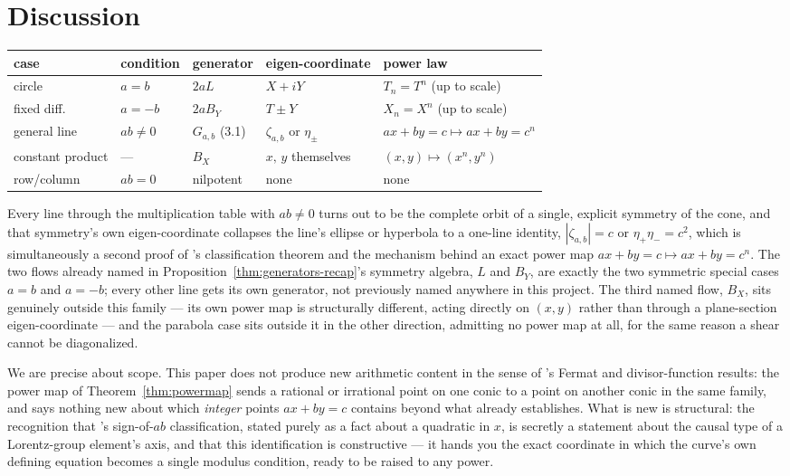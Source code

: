 \documentclass[11pt]{amsart}
\theoremstyle{remark}
\begin{document}
\section{Discussion}

\begin{center}
\begin{tabular}{lllll}
\hline
case & condition & generator & eigen-coordinate & power law \\
\hline
circle & $a=b$ & $2aL$ & $X+iY$ & $T_n=T^n$ (up to scale) \\
fixed diff. & $a=-b$ & $2aB_Y$ & $T\pm Y$ & $X_n=X^n$ (up to scale) \\
general line & $ab\ne0$ & $G_{a,b}$ (3.1) & $\zeta_{a,b}$ or $\eta_\pm$ & $ax+by=c\mapsto ax+by=c^n$ \\
constant product & --- & $B_X$ & $x,\,y$ themselves & $(x,y)\mapsto(x^n,y^n)$ \\
row/column & $ab=0$ & nilpotent & none & none \\
\hline
\end{tabular}
\end{center}

Every line through the multiplication table with $ab\ne0$ turns out to be the complete orbit of a single, explicit symmetry of the cone, and that symmetry's own eigen-coordinate collapses the line's ellipse or hyperbola to a one-line identity, $|\zeta_{a,b}|=c$ or $\eta_+\eta_-=c^2$, which is simultaneously a second proof of \cite{Ebert2026Table}'s classification theorem and the mechanism behind an exact power map $ax+by=c\mapsto ax+by=c^n$. The two flows already named in Proposition~\ref{thm:generators-recap}'s symmetry algebra, $L$ and $B_Y$, are exactly the two symmetric special cases $a=b$ and $a=-b$; every other line gets its own generator, not previously named anywhere in this project. The third named flow, $B_X$, sits genuinely outside this family --- its own power map is structurally different, acting directly on $(x,y)$ rather than through a plane-section eigen-coordinate --- and the parabola case sits outside it in the other direction, admitting no power map at all, for the same reason a shear cannot be diagonalized.

We are precise about scope. This paper does not produce new arithmetic content in the sense of \cite{Ebert2026Table}'s Fermat and divisor-function results: the power map of Theorem~\ref{thm:powermap} sends a rational or irrational point on one conic to a point on another conic in the same family, and says nothing new about which \emph{integer} points $ax+by=c$ contains beyond what \cite{Ebert2026Table} already establishes. What is new is structural: the recognition that \cite{Ebert2026Table}'s sign-of-$ab$ classification, stated purely as a fact about a quadratic in $x$, is secretly a statement about the causal type of a Lorentz-group element's axis, and that this identification is constructive --- it hands you the exact coordinate in which the curve's own defining equation becomes a single modulus condition, ready to be raised to any power.
\end{document}
